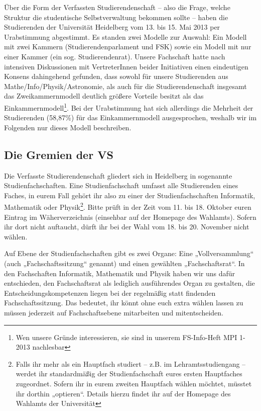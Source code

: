Über die Form der Verfassten Studierendenschaft -- also die Frage, welche
Struktur die studentische Selbstverwaltung bekommen sollte -- haben die Studierenden
der Universität Heidelberg vom 13. bis 15. Mai 2013 per Urabstimmung abgestimmt.
Es standen zwei Modelle zur Auswahl: Ein Modell mit zwei
Kammern (Studierendenparlament und FSK) sowie ein Modell mit nur einer
Kammer (ein sog. Studierendenrat). Unsere Fachschaft hatte nach intensiven Diskussionen mit
VertreterInnen beider Initiativen einen eindeutigen
Konsens dahingehend gefunden, dass sowohl für unsere Studierenden aus
Mathe/Info/Physik/Astronomie, als auch für die Studierendenschaft
insgesamt das Zweikammernmodell deutlich größere Vorteile besitzt als
das Einkammernmodell\footnote{Wen unsere Gründe interessieren, sie sind in unserem FS-Info-Heft MPI 1-2013 nachlesbar}.
Bei der Urabstimmung hat sich allerdings die Mehrheit der Studierenden (58,87\%)
für das Einkammernmodell ausgesprochen, weshalb wir im Folgenden nur dieses Modell beschreiben.



\subsection{Die Gremien der VS}

Die Verfasste Studierendenschaft gliedert sich in Heidelberg in sogenannte
Studienfachschaften. Eine Studienfachschaft umfasst alle
Studierenden eines Faches, in eurem Fall gehört ihr also zu einer der
Studienfachschaften Informatik, Mathematik oder Physik\footnote{Falls ihr
mehr als ein Hauptfach studiert -- z.B. im Lehramtsstudiengang -- werdet
ihr standardmäßig der Studienfachschaft eures ersten Hauptfaches zugeordnet.
Sofern ihr in eurem zweiten Hauptfach wählen möchtet, müsstet ihr dorthin „optieren“.
Details hierzu findet ihr auf der Homepage des Wahlamts der Universität}.
Bitte prüft in der Zeit vom 11. bis 18. Oktober euren Eintrag im Wäherverzeichnis
(einsehbar auf der Homepage des Wahlamts). Sofern ihr dort nicht auftaucht,
dürft ihr bei der Wahl vom 18. bis 20. November nicht wählen.

Auf Ebene der Studienfachschaften gibt es zwei Organe: Eine „Vollversammlung“ 
(auch „Fachschaftssitzung“ genannt) und einen gewählten „Fachschaftsrat“. In den 
Fachschaften Informatik, Mathematik und Physik haben wir uns dafür entschieden, 
den Fachschaftsrat als lediglich ausführendes Organ zu gestalten, die 
Entscheidungskompetenzen liegen bei der regelmäßig statt findenden Fachschaftssitzung.
Das bedeutet, ihr könnt ohne euch extra wählen lassen zu müssen jederzeit
auf Fachschaftsebene mitarbeiten und mitentscheiden.

